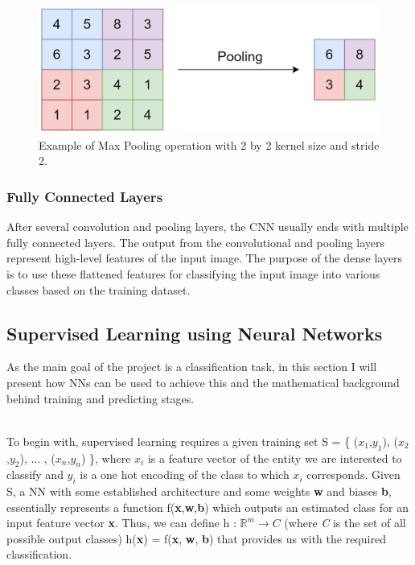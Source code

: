 \begin{figure}[H]
  \centering
  \includegraphics[scale=0.3]{Images/pooling.png}
  \caption{Example of Max Pooling operation with 2 by 2 kernel size and stride 2.}
  \label{Pooling}
\end{figure}

\subsubsection*{Fully Connected Layers}

After several convolution and pooling layers, the CNN usually ends with multiple fully connected layers. The output from the convolutional and pooling layers represent high-level features of the input image. The purpose of the dense layers is to use these flattened features for classifying the input image into various classes based on the training dataset. \\

\subsection{Supervised Learning using Neural Networks}

As the main goal of the project is a classification task, in this section I will present how NNs can be used to achieve this and the mathematical background behind training and predicting stages. \\\

To begin with, supervised learning requires a given training set S = \{ ($x_1$,$y_1$), ($x_2$,$y_2$), ... , ($x_n$,$y_n$) \}, where \textbf{$x_i$} is a feature vector of the entity we are interested to classify and \textbf{$y_i$} is a one hot encoding of the class to which \textbf{$x_i$} corresponds. Given S, a NN with some established architecture and some weights \textbf{w} and biases \textbf{b}, essentially represents a function f(\textbf{x},\textbf{w},\textbf{b}) which outputs an estimated class for an input feature vector \textbf{x}. Thus, we can define h : $\mathbb{R}^m \rightarrow \textit{C}$ (where \textit{C} is the set of all possible output classes) h(\textbf{x}) = f(\textbf{x}, \textbf{w}, \textbf{b}) that provides us with the required classification.

